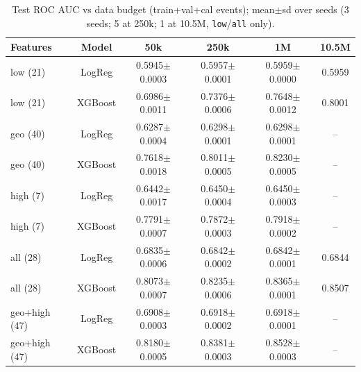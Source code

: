 \begin{table}[!t]
\centering
\caption{Test ROC AUC vs data budget (train+val+cal events); mean$\pm$sd over seeds (3 seeds; 5 at 250k; 1 at 10.5M, \texttt{low}/\texttt{all} only).}
\label{tab:scaling_ml}
\footnotesize
\setlength{\tabcolsep}{3.5pt}
\begin{tabular}{lccccc}
\toprule
Features & Model & 50k & 250k & 1M & 10.5M \\
\midrule
low (21) & LogReg & 0.5945$\pm$0.0003 & 0.5957$\pm$0.0001 & 0.5959$\pm$0.0000 & 0.5959 \\
low (21) & XGBoost & 0.6986$\pm$0.0011 & 0.7376$\pm$0.0006 & 0.7648$\pm$0.0012 & 0.8001 \\
geo (40) & LogReg & 0.6287$\pm$0.0004 & 0.6298$\pm$0.0001 & 0.6298$\pm$0.0001 & -- \\
geo (40) & XGBoost & 0.7618$\pm$0.0018 & 0.8011$\pm$0.0005 & 0.8230$\pm$0.0005 & -- \\
high (7) & LogReg & 0.6442$\pm$0.0017 & 0.6450$\pm$0.0004 & 0.6450$\pm$0.0003 & -- \\
high (7) & XGBoost & 0.7791$\pm$0.0007 & 0.7872$\pm$0.0003 & 0.7918$\pm$0.0002 & -- \\
all (28) & LogReg & 0.6835$\pm$0.0006 & 0.6842$\pm$0.0002 & 0.6842$\pm$0.0001 & 0.6844 \\
all (28) & XGBoost & 0.8073$\pm$0.0007 & 0.8235$\pm$0.0006 & 0.8365$\pm$0.0001 & 0.8507 \\
geo+high (47) & LogReg & 0.6908$\pm$0.0003 & 0.6918$\pm$0.0002 & 0.6918$\pm$0.0001 & -- \\
geo+high (47) & XGBoost & 0.8180$\pm$0.0005 & 0.8381$\pm$0.0003 & 0.8528$\pm$0.0003 & -- \\
\bottomrule
\end{tabular}
\end{table}
